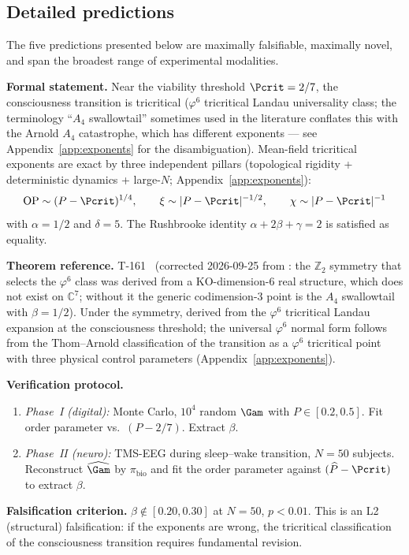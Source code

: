 \subsection{Detailed predictions}

The five predictions presented below are maximally falsifiable, maximally
novel, and span the broadest range of experimental modalities.

\begin{predictionbox}
\textbf{Formal statement.}
Near the viability threshold $\Pcrit = 2/7$, the consciousness transition is tricritical
($\varphi^6$ tricritical Landau universality class; the terminology ``$A_4$ swallowtail''
sometimes used in the literature conflates this with the Arnold $A_4$ catastrophe, which has
different exponents --- see Appendix~\ref{app:exponents} for the disambiguation).
Mean-field tricritical exponents are exact by three independent pillars
(topological rigidity + deterministic dynamics + large-$N$; Appendix~\ref{app:exponents}):
\begin{equation}
  \mathrm{OP} \sim (P - \Pcrit)^{1/4}, \qquad
  \xi \sim |P - \Pcrit|^{-1/2}, \qquad
  \chi \sim |P - \Pcrit|^{-1}
\end{equation}
with $\alpha = 1/2$ and $\delta = 5$. The Rushbrooke identity $\alpha + 2\beta + \gamma = 2$ is satisfied as equality.

\medskip\noindent
\textbf{Theorem reference.} T-161~
(corrected 2026-09-25 from : the $\mathbb{Z}_2$ symmetry that selects
the $\varphi^6$ class was derived from a KO-dimension-6 real structure, which
does not exist on $\mathbb{C}^7$; without it the generic codimension-3 point is
the $A_4$ swallowtail with $\beta = 1/2$). Under the symmetry, derived from the $\varphi^{6}$
tricritical Landau expansion at the consciousness threshold; the universal
$\varphi^{6}$ normal form follows from the Thom--Arnold classification of
the transition as a $\varphi^6$ tricritical point with three physical
control parameters (Appendix~\ref{app:exponents}).

\medskip\noindent
\textbf{Verification protocol.}
\begin{enumerate}[leftmargin=2em,nosep]
  \item \emph{Phase~I (digital):} Monte Carlo, $10^4$ random $\Gam$ with $P \in [0.2, 0.5]$.
        Fit order parameter vs.\ $(P - 2/7)$. Extract $\beta$.
  \item \emph{Phase~II (neuro):} TMS-EEG during sleep--wake transition, $N = 50$ subjects.
        Reconstruct $\widehat\Gam$ by $\pi_{\mathrm{bio}}$ and fit the order
        parameter against $(\widehat P - \Pcrit)$ to extract $\beta$.
\end{enumerate}

\medskip\noindent
\textbf{Falsification criterion.}
$\beta \notin [0.20, 0.30]$ at $N = 50$, $p < 0.01$. This is an L2 (structural) falsification:
if the exponents are wrong, the tricritical classification of the consciousness transition requires fundamental revision.
\end{predictionbox}


